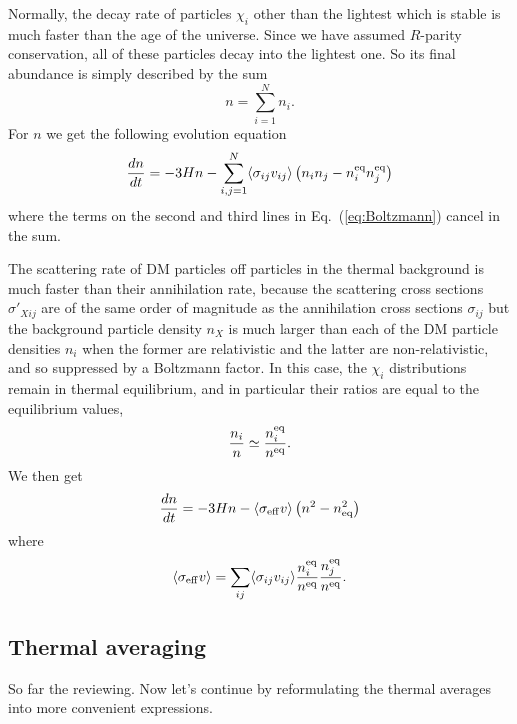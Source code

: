 \documentclass[a4paper,10pt,oneside]{book}
\begin{document}
Normally, the decay rate of particles $\chi_i$ other
than the lightest which is stable is much faster than the age of the
universe. Since we have assumed $R$-parity conservation, all of these
particles decay into the lightest one. So its final abundance is
simply described by the sum
\begin{equation}
  n= \sum_{i=1}^N n_{i}.
\end{equation}
For $n$ we get the following evolution equation
\begin{equation}
  \frac{dn}{dt} = -3Hn - \sum_{i,j=1}^N \langle \sigma_{ij} v_{ij} \rangle 
  \left( n_{i}n_{j} - n_{i}^{\rm{eq}}n_{j}^{\rm{eq}} \right)
\end{equation}
where the terms on the second and third lines in
Eq.~(\ref{eq:Boltzmann}) cancel in the sum. 

The scattering rate of DM particles off particles in the
thermal background is much faster than their annihilation rate,
because the scattering cross sections $\sigma'_{Xij}$ are of the same
order of magnitude as the annihilation cross sections $\sigma_{ij}$
but the background particle density $n_X$ is much larger than each of
the DM particle densities $n_i$ when the former are
relativistic and the latter are non-relativistic, and so suppressed by
a Boltzmann factor. In this case, the $\chi_i$ distributions remain in
thermal equilibrium, and in particular their ratios are equal to the
equilibrium values,
\begin{equation}
  \frac{n_{i}}{n} \simeq \frac{n_{i}^{\rm{eq}}}{n^{\rm{eq}}}.
\end{equation}
We then get
\begin{equation} \label{eq:Boltzmann2}
  \frac{dn}{dt} =
  -3Hn - \langle \sigma_{\rm{eff}} v \rangle 
  \left( n^2 - n_{\rm{eq}}^2 \right)
\end{equation}
where
\begin{equation} \label{eq:sigmaveffdef}
  \langle \sigma_{\rm{eff}} v \rangle = \sum_{ij} \langle
  \sigma_{ij}v_{ij} \rangle \frac{n_{i}^{\rm{eq}}}{n^{\rm{eq}}}
  \frac{n_{j}^{\rm{eq}}}{n^{\rm{eq}}}.
\end{equation}


\subsection{Thermal averaging}
\label{sec:thermav}

So far the reviewing. Now let's continue
by reformulating the thermal averages into
more convenient expressions. 
\end{document}
